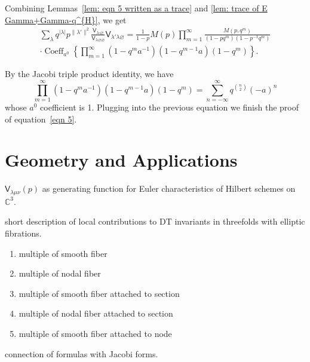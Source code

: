 \documentclass[12pt]{amsart}
\newcommand{\cnums} {{\mathbb C}}          %
\newcommand{\Vsf}{\mathsf{V}}
\newcommand{\bx}{\square}
\renewcommand{\emptyset}{\varnothing}
\theoremstyle{definition}
\begin{document}
Combining Lemmas~\ref{lem: eqn 5 written as a trace} and \ref{lem:
trace of E Gamma+Gamma-q^{H}}, we get
\begin{multline*}
\sum_{\lambda} q^{|\lambda |} p^{\| \lambda' \|  ^{2}} \frac{\Vsf_{\lambda
\bx \emptyset}}{\Vsf_{\lambda \emptyset \emptyset}} \Vsf_{\lambda
'\lambda \emptyset} =\frac{1}{1-p} M(p)\prod_{m=1}^{\infty}
\frac{M(p,q^{m})}{(1-pq^{m})(1-p^{-1}q^{m})}\\
 \cdot \operatorname{Coeff}_{a^{0}}\left\{\prod_{m=1}^{\infty}
(1-q^{m}a^{-1})(1-q^{m-1}a)(1-q^{m}) \right\}.
\end{multline*}

By the Jacobi triple product identity, we have
\[
\prod_{m=1}^{\infty} (1-q^{m}a^{-1})(1-q^{m-1}a)(1-q^{m}) =
\sum_{n=-\infty}^{\infty} q^{\binom{n}{2}} (-a)^{n}
\]
whose $a^{0}$ coefficient is 1. Plugging into the previous equation we
finish the proof of equation~\eqref{eqn 5}.

\section{Geometry and Applications}\label{sec: geometry and applications}

\smallskip

$\Vsf_{\lambda \mu \nu}(p)$ as generating function for Euler
characteristics of Hilbert schemes on $\cnums^{3}$.

\smallskip

short description of local contributions to DT invariants in
threefolds with elliptic fibrations. \begin{enumerate}
\item multiple of smooth fiber
\item multiple of nodal fiber
\item multiple of smooth fiber attached to section
\item multiple of nodal fiber attached to section
\item multiple of smooth fiber attached to node
\end{enumerate}

\smallskip
connection of formulas with Jacobi forms. 





\end{document}
